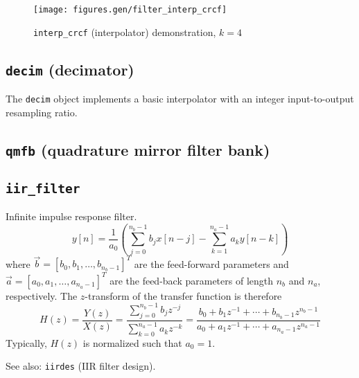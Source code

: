 

\begin{figure}
\centering
  \texttt{[image: figures.gen/filter\_interp\_crcf]}
\caption{{\tt interp\_crcf} (interpolator) demonstration, $k=4$}
\label{fig:module:filter:interp_crcf}
\end{figure}


\subsection{{\tt decim} (decimator)}
The {\tt decim} object implements a basic interpolator with an integer
input-to-output resampling ratio.

\subsection{{\tt qmfb} (quadrature mirror filter bank)}

\subsection{{\tt iir\_filter}}
Infinite impulse response filter.
\[
    y[n] = \frac{1}{a_0} \left(
           \sum_{j=0}^{n_b-1}{ b_j x[n-j] } -
           \sum_{k=1}^{n_a-1}{ a_k y[n-k] }
           \right)
\]
where $\vec{b} = [b_0,b_1,\ldots,b_{n_b-1}]^T$ are the feed-forward parameters
and   $\vec{a} = [a_0,a_1,\ldots,a_{n_a-1}]^T$ are the feed-back parameters
of length $n_b$ and $n_a$, respectively.
The $z$-transform of the transfer function is therefore
\[
    H(z) = \frac{Y(z)}{X(z)}
         = \frac{\sum\limits_{j=0}^{n_b-1}{b_j z^{-j}}}
                {\sum\limits_{k=0}^{n_a-1}{a_k z^{-k}}}
         = \frac{ b_0 + b_1 z^{-1} + \cdots + b_{n_b-1} z^{n_b-1}}
                { a_0 + a_1 z^{-1} + \cdots + a_{n_a-1} z^{n_a-1}}
\]
Typically, $H(z)$ is normalized such that $a_0=1$.

See also: {\tt iirdes} (IIR filter design).

